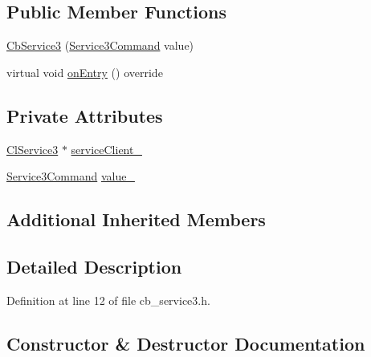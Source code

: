 \subsection*{Public Member Functions}
\begin{DoxyCompactItemize}
\item 
\hyperlink{classsm__dance__bot_1_1CbService3_adce61c03c3aa00f69f34e73e32342c1e}{Cb\+Service3} (\hyperlink{namespacesm__dance__bot_a2d0902aa29698165effd2c3248a9c8ff}{Service3\+Command} value)
\item 
virtual void \hyperlink{classsm__dance__bot_1_1CbService3_ad55a19f6755b493f9cef0f7620cd382c}{on\+Entry} () override
\end{DoxyCompactItemize}
\subsection*{Private Attributes}
\begin{DoxyCompactItemize}
\item 
\hyperlink{classsm__dance__bot_1_1ClService3}{Cl\+Service3} $\ast$ \hyperlink{classsm__dance__bot_1_1CbService3_a23064503560f82cf5d6e24e393c2aa9c}{service\+Client\+\_\+}
\item 
\hyperlink{namespacesm__dance__bot_a2d0902aa29698165effd2c3248a9c8ff}{Service3\+Command} \hyperlink{classsm__dance__bot_1_1CbService3_a82b3136997a198b0c880ef1b170e7502}{value\+\_\+}
\end{DoxyCompactItemize}
\subsection*{Additional Inherited Members}


\subsection{Detailed Description}


Definition at line 12 of file cb\+\_\+service3.\+h.



\subsection{Constructor \& Destructor Documentation}
